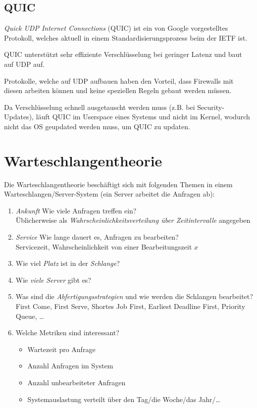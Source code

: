 \documentclass[a4paper, 11pt, accentcolor = tud3b]{tudreport}
\begin{document}
        \section{QUIC}
            \textit{Quick UDP Internet Connections} (QUIC) ist ein von Google vorgestelltes Protokoll, welches aktuell in einem Standardisierungsprozess beim der IETF ist.
            
            QUIC unterstützt sehr effiziente Verschlüsselung bei geringer Latenz und baut auf UDP auf.
            
            Protokolle, welche auf UDP aufbauen haben den Vorteil, dass Firewalls mit diesen arbeiten können und keine speziellen Regeln gebaut werden müssen.
            
            Da Verschlüsselung schnell ausgetauscht werden muss (z.B. bei Security-Updates), läuft QUIC im Userspace eines Systems und nicht im Kernel, wodurch nicht das OS geupdated werden muss, um QUIC zu updaten.

    \chapter{Warteschlangentheorie}
        Die Warteschlangentheorie beschäftigt sich mit folgenden Themen in einem Warteschlangen/Server-System (ein Server arbeitet die Anfragen ab):
        \begin{enumerate}
        	\item \textit{Ankunft} Wie viele Anfragen treffen ein? \\ Üblicherweise als \textit{Wahrscheinlichkeitsverteilung über Zeitintervalle} angegeben
        	\item \textit{Service} Wie lange dauert es, Anfragen zu bearbeiten? \\ Servicezeit, Wahrscheinlichkeit von einer Bearbeitungszeit $ x $
        	\item Wie viel \textit{Platz} ist in der \textit{Schlange}?
        	\item Wie \textit{viele Server} gibt es?
        	\item Was sind die \textit{Abfertigungsstrategien} und wie werden die Schlangen bearbeitet? \\ First Come, First Serve, Shortes Job First, Earliest Deadline First, Priority Queue, \dots
        	\item Welche Metriken sind interessant?
	        	\begin{itemize}
	        		\item Wartezeit pro Anfrage
	        		\item Anzahl Anfragen im System
	        		\item Anzahl unbearbeiteter Anfragen
	        		\item Systemauslastung verteilt über den Tag/die Woche/das Jahr/\dots
	        	\end{itemize}
        \end{enumerate}
\end{document}
